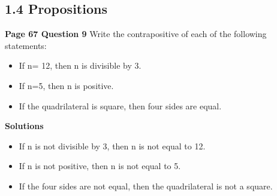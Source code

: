 \subsection*{1.4 Propositions}
\textbf{Page 67 Question 9}
Write the contrapositive of each of the following statements:

\begin{itemize}
\item If n= 12, then n is divisible by 3.
\item If n=5, then n is positive.
\item If the quadrilateral is square, then four sides are equal.
\end{itemize}

\textbf{Solutions}
\begin{itemize}
\item If n is not divisible by 3, then n is not equal to 12.
\item If n is not positive, then n is not equal to 5.
\item If the four sides are not equal, then the quadrilateral is not a square.
\end{itemize}




